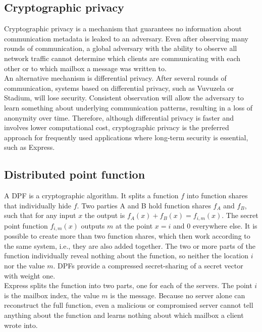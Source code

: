 \documentclass[a4paper]{article}
\begin{document}
\subsection{Cryptographic privacy}
\label{subsec:first-background}
Cryptographic privacy is a mechanism that guarantees no information about communication metadata is leaked to an adversary. Even after observing many rounds of communication, a global adversary with the ability to observe all network traffic cannot determine which clients are communicating with each other or to which mailbox a message was written to. \\
An alternative mechanism is differential privacy. After several rounds of communication, systems based on differential privacy, such as Vuvuzela or Stadium, will lose security. Consistent observation will allow the adversary to learn something about underlying communication patterns, resulting in a loss of anonymity over time. Therefore, although differential privacy is faster and involves lower computational cost, cryptographic privacy is the preferred approach for frequently used applications where long-term security is essential, such as Express.  


\subsection{Distributed point function}
\label{subsec:DPF}
A DPF \citep{DPF2023} is a cryptographic algorithm. It splits a function $f$ into function shares that individually hide $f$. Two parties A and B hold function shares $f_A$ and $f_B$, such that for any input $x$ the output is $f_A(x) + f_B(x) = f_{i,m}(x)$. The secret point function $f_{i,m}(x)$ outputs $m$ at the point $x = i$ and $0$ everywhere else. It is possible to create more than two function shares, which then work according to the same system, i.e., they are also added together. The two or more parts of the function individually reveal nothing about the function, so neither the location $i$ nor the value $m$. DPFs provide a compressed secret-sharing of a secret vector with weight one. \\
Express splits the function into two parts, one for each of the servers. The point $i$ is the mailbox index, the value $m$ is the message. 
Because no server alone can reconstruct the full function, even a malicious or compromised server cannot tell anything about the function and learns nothing about which mailbox a client wrote into. 
\end{document}
